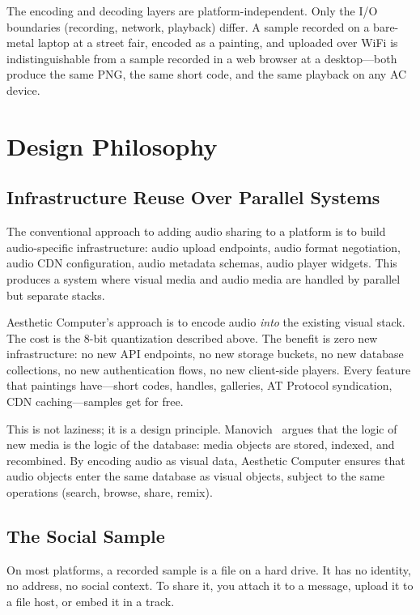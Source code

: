 \documentclass[10pt,letterpaper,twocolumn]{article}
\newcommand{\ac}{Aesthetic Computer}
\begin{document}
The encoding and decoding layers are platform-independent. Only the I/O boundaries (recording, network, playback) differ. A sample recorded on a bare-metal laptop at a street fair, encoded as a painting, and uploaded over WiFi is indistinguishable from a sample recorded in a web browser at a desktop---both produce the same PNG, the same short code, and the same playback on any AC device.

\section{Design Philosophy}

\subsection{Infrastructure Reuse Over Parallel Systems}

The conventional approach to adding audio sharing to a platform is to build audio-specific infrastructure: audio upload endpoints, audio format negotiation, audio CDN configuration, audio metadata schemas, audio player widgets. This produces a system where visual media and audio media are handled by parallel but separate stacks.

\ac{}'s approach is to encode audio \emph{into} the existing visual stack. The cost is the 8-bit quantization described above. The benefit is zero new infrastructure: no new API endpoints, no new storage buckets, no new database collections, no new authentication flows, no new client-side players. Every feature that paintings have---short codes, handles, galleries, AT Protocol syndication, CDN caching---samples get for free.

This is not laziness; it is a design principle. Manovich~\citep{manovich2001language} argues that the logic of new media is the logic of the database: media objects are stored, indexed, and recombined. By encoding audio as visual data, \ac{} ensures that audio objects enter the same database as visual objects, subject to the same operations (search, browse, share, remix).

\subsection{The Social Sample}

On most platforms, a recorded sample is a file on a hard drive. It has no identity, no address, no social context. To share it, you attach it to a message, upload it to a file host, or embed it in a track.
\end{document}
